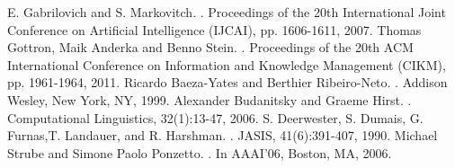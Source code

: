 \documentclass[conference]{IEEEtran}
\begin{document}
\begin{thebibliography}{1}
E. Gabrilovich and S. Markovitch.
.
\newblock Proceedings of the 20th International Joint Conference on Artificial Intelligence (IJCAI), pp. 1606-1611, 2007.
Thomas Gottron, Maik Anderka and Benno Stein.
.
\newblock Proceedings of the 20th ACM International Conference on Information and Knowledge Management (CIKM), pp. 1961-1964, 2011.
Ricardo Baeza-Yates and Berthier Ribeiro-Neto.
.
\newblock Addison Wesley, New York, NY, 1999.
Alexander Budanitsky and Graeme Hirst.
.
\newblock Computational Linguistics, 32(1):13-47, 2006.
S. Deerwester, S. Dumais, G. Furnas,T. Landauer, and R. Harshman.
.
\newblock JASIS, 41(6):391-407, 1990.
Michael Strube and Simone Paolo Ponzetto.
.
\newblock In AAAI’06, Boston, MA, 2006.
\end{thebibliography}
\end{document}
